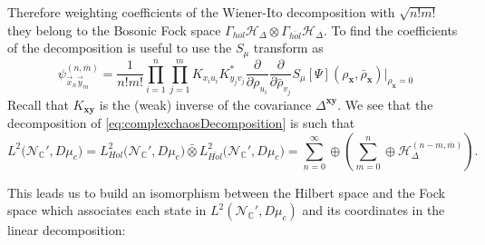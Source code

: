 \documentclass[12pt]{article}%
\begin{document}
    Therefore weighting coefficients   of the Wiener-Ito decomposition with $\sqrt{n!m!}$ they belong to the Bosonic Fock space $\Gamma_{hol}\mathcal{H}_\Delta\otimes \Gamma_{\overline{hol}}\mathcal{H}_\Delta$.  To find the coefficients of the decomposition is useful to use the $S_{\mu}$ transform as
    \begin{equation}
    \label{eq:wienerItoSeagalwithTtransform}
    \psi^{(n,\bar{m})}_{\vec{x}_n\vec{y}_m}=\frac{1}{n!m!}\prod_{i=1}^n\prod_{j=1}^m K_{x_iu_i}K^*_{y_jv_j}\frac{\partial}{\partial \rho_{u_i}}\frac{\partial}{\partial \bar\rho_{v_j}}  {S_\mu[\Psi](\rho_\mathbf{x},\bar{\rho}_\mathbf{x})} \bigg\lvert_{\rho_\mathbf{x}=0}
    \end{equation}
    Recall that $K_{\mathbf{xy}}$ is the  (weak) inverse of the covariance $\Delta^{\mathbf{xy}}$.
     We see that the decomposition of \eqref{eq:complexchaosDecomposition} is such that
     \begin{equation}
        \label{eq:holantiholdec}
        L^2\big({\mathcal{N}_{\mathbb{C}}'}, D\mu_c\big)=L^2_{Hol}\big({\mathcal{N}_{\mathbb{C}}'}, D\mu_c\big)\bar{\otimes} L^2_{\overline{Hol}}\big({\mathcal{N}_{\mathbb{C}}'}, D\mu_c\big)=\sum_{n=0}^\infty\oplus \left( \sum_{m=0}^n\oplus \mathcal{H}_\Delta^{(n-m,\bar{m})} \right).
    \end{equation}

    This leads us to build an isomorphism between the Hilbert space and the Fock space which associates each state in $L^2({\mathcal{N}_{\mathbb{C}}'}, D\mu_c)$ and its coordinates in the linear decomposition:
\end{document}
